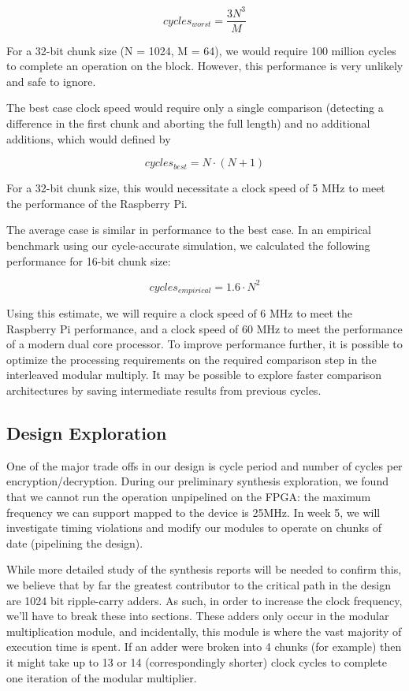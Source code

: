 \documentclass[12pt]{article}
\begin{document}
\begin{equation}
cycles_{worst}=\frac{3N^{3}}{M}
\end{equation}

For a 32-bit chunk size (N = 1024, M = 64), we would require 100 million cycles
to complete an operation on the block. However, this performance is very unlikely and
safe to ignore. 

The best case clock speed would require only a single comparison (detecting a difference
in the first chunk and aborting the full length) and no additional additions,
which would defined by

\begin{equation}
cycles_{best}=N\cdot (N+1)
\end{equation}

For a 32-bit chunk size, this would necessitate a clock speed of 5 MHz to meet the
performance of the Raspberry Pi.

The average case is similar in performance to the best case. In an empirical benchmark
using our cycle-accurate simulation, we calculated the following performance for 16-bit
chunk size:

\begin{equation}
cycles_{empirical}=1.6\cdot{N}^2
\end{equation}

Using this estimate, we will require a clock speed of 6 MHz to meet the Raspberry Pi performance, and
a clock speed of 60 MHz to meet the performance of a modern dual core processor. To improve performance further, 
it is possible to optimize the processing requirements on the required comparison step in the interleaved
modular multiply. It may be possible to explore faster comparison architectures by saving intermediate 
results from previous cycles.

\subsection{Design Exploration}
One of the major trade offs in our design is cycle period and number of cycles per encryption/decryption. 
During our preliminary synthesis exploration, we found that we cannot run the operation unpipelined on the FPGA:
the maximum frequency we can support mapped to the device is 25MHz.
In week 5, we will investigate timing violations and
modify our modules to operate on chunks of date (pipelining the design).  

While more detailed study of the synthesis reports will be needed to confirm this,
we believe that by far the greatest contributor to the critical path in the design are 1024 bit ripple-carry adders.
As such, in order to increase the clock frequency, we'll have to break these into sections.
These adders only occur in the modular multiplication module, and incidentally,
this module is where the vast majority of execution time is spent.
If an adder were broken into 4 chunks (for example) then it might take up to 13 or 14 (correspondingly shorter)
clock cycles to complete one iteration of the modular multiplier.
\end{document}
